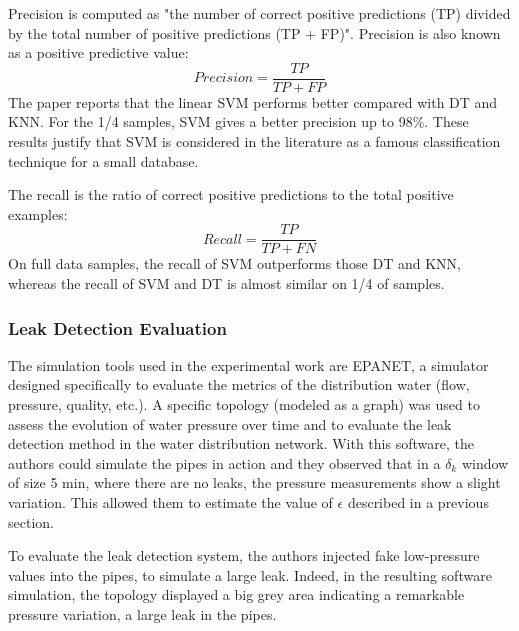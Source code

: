 \documentclass[draft, {\secondLanguage}, english]{volcanica-template}
\begin{document}
Precision is computed as "the number of correct positive predictions (TP) divided
by the total number of positive predictions (TP + FP)". Precision is also known as a
positive predictive value:
\begin{equation}
    Precision = \frac{TP}{TP+FP}
\end{equation}
The paper reports that the linear SVM performs better compared with DT and KNN. For the 1/4 samples, SVM gives a better precision up to 98\%. These results justify that SVM is considered in the literature as a famous classification technique for a small database.

The recall is the ratio of correct positive predictions to the total positive examples:
\begin{equation}
    Recall = \frac{TP}{TP+FN}
\end{equation}
On full data samples, the recall of SVM outperforms those DT and KNN, whereas the recall of SVM and DT is almost similar on 1/4 of samples.

\subsubsection{Leak Detection Evaluation}
The simulation tools used in the experimental work are EPANET, a simulator designed specifically to evaluate the metrics of the distribution water (flow, pressure, quality, etc.). A specific topology (modeled as a graph) was used to assess the evolution of water pressure over time and to evaluate the leak detection method in the water distribution network. With this software, the authors could simulate the pipes in action and they observed that in a $\delta_k$ window of size 5 min, where there are no leaks, the pressure measurements show a slight variation. This allowed them to estimate the value of $\epsilon$ described in a previous section.

To evaluate the leak detection system, the authors injected fake low-pressure values into the pipes, to simulate a large leak. Indeed, in the resulting software simulation, the topology displayed a big grey area indicating a remarkable pressure variation, a large leak in the pipes.
\end{document}
